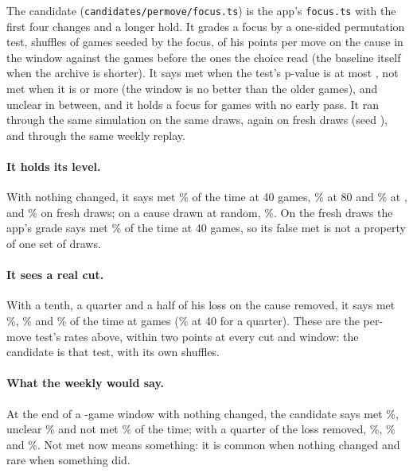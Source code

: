 \documentclass[11pt]{article}
\begin{document}
The candidate (\texttt{candidates/permove/focus.ts}) is the app's \texttt{focus.ts} with the first
four changes and a longer hold. It grades a focus by a one-sided permutation test, \CandPerms{}
shuffles of games seeded by the focus, of his points per move on the cause in the window against
the \Baseline{} games before the ones the choice read (the baseline itself when the archive is
shorter). It says met when the test's p-value is at most \MetP, not met when it is
\NotMetP{} or more (the window is no better than the older games), and unclear in between, and it
holds a focus for \CandWindow{} games with no early pass. It ran through the same simulation on the
same draws, again on fresh draws (seed \FreshSeed), and through the same weekly replay.

\paragraph{It holds its level.} With nothing changed, it says met \CandNull\% of the time at 40
games, \CandNullMid\% at 80 and \CandNullLong\% at \CandWindow, and \CandNullFresh\% on fresh draws;
on a cause drawn at random, \CandControl\%. On the fresh draws the app's grade says met
\AppNullFresh\% of the time at 40 games, so its false met is not a property of one set of draws.

\paragraph{It sees a real cut.} With a tenth, a quarter and a half of his loss on the cause
removed, it says met \CandTenthLong\%, \CandQuarterLong\% and \CandHalfLong\% of the time at
\CandWindow{} games (\CandQuarter\% at 40 for a quarter). These are the per-move test's rates
above, within two points at every cut and window: the candidate is that test, with its own
shuffles.

\paragraph{What the weekly would say.} At the end of a \CandWindow-game window with nothing
changed, the candidate says met \VNullMet\%, unclear \VNullUnclear\% and not met \VNullNotMet\% of the
time; with a quarter of the loss removed, \VQuarterMet\%, \VQuarterUnclear\% and \VQuarterNotMet\%.
Not met now means something: it is common when nothing changed and rare when something did.
\end{document}

